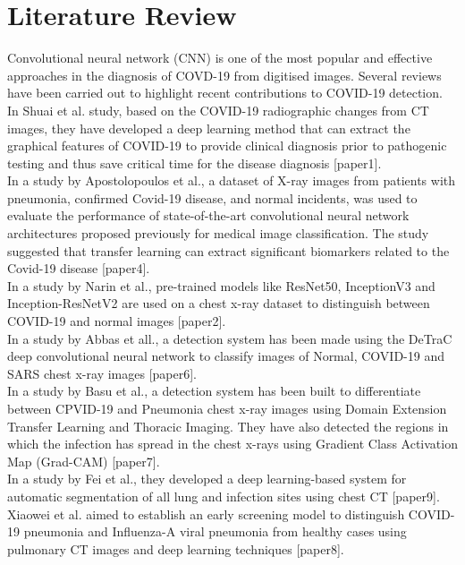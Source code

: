\documentclass[12pt]{revtex4}
\begin{document}
\section{Literature Review}
Convolutional neural network (CNN) is one of the most popular and effective approaches in the diagnosis of COVD-19 from digitised images. Several reviews have been carried out to highlight recent contributions to COVID-19 detection.
\\In Shuai et al. study, based on the COVID-19 radiographic changes from CT images, they have developed a deep learning method that can extract the graphical features of COVID-19 to provide clinical diagnosis prior to pathogenic testing and thus save critical time for the disease diagnosis [paper1].
\\In a study by Apostolopoulos et al., a dataset of X-ray images from patients with pneumonia, confirmed Covid-19 disease, and normal incidents, was used to evaluate the performance of state-of-the-art convolutional neural network architectures proposed previously for medical image classification. The study suggested that transfer learning can extract significant biomarkers related to the Covid-19 disease [paper4].
\\In a study by Narin et al., pre-trained models like ResNet50, InceptionV3 and Inception-ResNetV2 are used on a chest x-ray dataset to distinguish between COVID-19 and normal images [paper2]. 
\\In a study by Abbas et all., a detection system has been made using the DeTraC deep convolutional neural network to classify images of Normal, COVID-19 and SARS chest x-ray images [paper6].
\\In a study by Basu et al., a detection system has been built to differentiate between CPVID-19 and Pneumonia chest x-ray images using Domain Extension Transfer Learning and Thoracic Imaging. They have also detected the regions in which the infection has spread in the chest x-rays using Gradient Class Activation Map (Grad-CAM) [paper7]. 
\\In a study by Fei et al., they developed a deep learning-based system for automatic segmentation of all lung and infection sites using chest CT [paper9]. 
\\Xiaowei et al. aimed to establish an early screening model to distinguish COVID-19 pneumonia and Influenza-A viral pneumonia from healthy cases using pulmonary CT images and deep learning techniques [paper8]. 


\pagebreak
\end{document}

